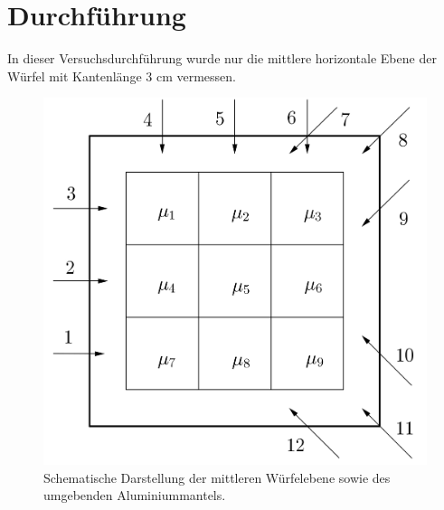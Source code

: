 

\section{Durchführung}
In dieser Versuchsdurchführung wurde nur die mittlere horizontale Ebene der Würfel mit Kantenlänge 
$3$ cm vermessen.

\begin{figure}[h]
\centering
\includegraphics[scale=0.18]{../skript/domi.jpg}
\caption{Schematische Darstellung der mittleren Würfelebene sowie des umgebenden 
Aluminiummantels.}
\label{fig:Wuerfel}
\end{figure}

